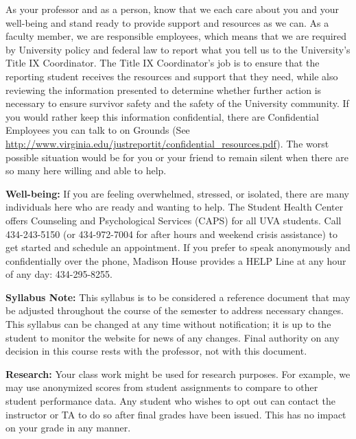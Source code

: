 \documentclass[12pt]{article}
\begin{document}
As your professor and as a person, know that we each care about you and your well-being and stand ready to provide support and resources as we can. As a faculty member, we are responsible employees, which means that we are required by University policy and federal law to report what you tell us to the University's Title IX Coordinator. The Title IX Coordinator's job is to ensure that the reporting student receives the resources and support that they need, while also reviewing the information presented to determine whether further action is necessary to ensure survivor safety and the safety of the University community. If you would rather keep this information confidential, there are Confidential Employees you can talk to on Grounds (See \url{http://www.virginia.edu/justreportit/confidential\_resources.pdf}). The worst possible situation would be for you or your friend to remain silent when there are so many here willing and able to help.

\textbf{Well-being:} If you are feeling overwhelmed, stressed, or isolated, there are many individuals here who are ready and wanting to help. The Student Health Center offers Counseling and Psychological Services (CAPS) for all UVA students. Call 434-243-5150 (or 434-972-7004 for after hours and weekend crisis assistance) to get started and schedule an appointment. If you prefer to speak anonymously and confidentially over the phone, Madison House provides a HELP Line at any hour of any day: 434-295-8255.

\textbf{Syllabus Note:} This syllabus is to be considered a reference document that may be adjusted throughout the course of the semester to address necessary changes. This syllabus can be changed at any time without notification; it is up to the student to monitor the website for news of any changes. Final authority on any decision in this course rests with the professor, not with this document.

\textbf{Research:}
Your class work might be used for research purposes. For example, we may use anonymized scores from student assignments to compare to other student performance data. Any student who wishes to opt out can contact the instructor or TA to do so after final grades have been issued. This has no impact on your grade in any manner. 
\end{document}
